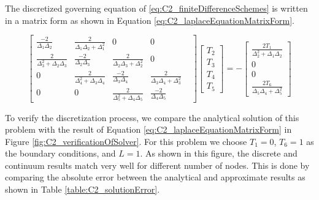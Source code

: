 The discretized governing equation of \eqref{eq:C2_finiteDifferenceSchemes} is written in a matrix form as shown in Equation \eqref{eq:C2_laplaceEquationMatrixForm}.

\begin{equation}\label{eq:C2_laplaceEquationMatrixForm}
	\begin{bmatrix}
		\frac{-2}{\Delta_{1} \Delta_{2}} &
		\frac{2}{\Delta_{1} \Delta_{2} + \Delta_{1}^2} &
		0 &
		0 &
		\\
		\frac{2}{\Delta_{3}^2 + \Delta_{2} \Delta_{3}} & 
		\frac{-2}{\Delta_{2} \Delta_{3}} &
		\frac{2}{\Delta_{2} \Delta_{3} + \Delta_{2}^2} &
		0
		\\
		0 &
		\frac{2}{\Delta_{4}^2 + \Delta_{3} \Delta_{4}} & 
		\frac{-2}{\Delta_{3} \Delta_{4}} &
		\frac{2}{\Delta_{3} \Delta_{4} + \Delta_{3}^2} &
		\\
		0 &
		0 &
		\frac{2}{\Delta_{5}^2 + \Delta_{4} \Delta_{5}} & 
		\frac{-2}{\Delta_{4} \Delta_{5}}
	\end{bmatrix}
	\begin{bmatrix}
		T_2 \\
		T_3 \\
		T_4 \\
		T_5
	\end{bmatrix}
	=
	-\begin{bmatrix}
	 	\frac{2T_1}{\Delta_{2}^2 + \Delta_{1} \Delta_{2}} \\
 		0 \\
		0 \\
		\frac{2T_6}{\Delta_{5} \Delta_{4} + \Delta_{5}^2}
	\end{bmatrix}
\end{equation}

To verify the discretization process, we compare the analytical solution of this problem with the result of Equation \eqref{eq:C2_laplaceEquationMatrixForm} in Figure \ref{fig:C2_verificationOfSolver}. For this problem we choose $T_1 = 0$, $T_6 = 1$ as the boundary conditions, and $L = 1$.  As shown in this figure, the discrete and continuum results match very well for different number of nodes. This is done by comparing the absolute error between the analytical and approximate results as shown in Table \ref{table:C2_solutionError}.

